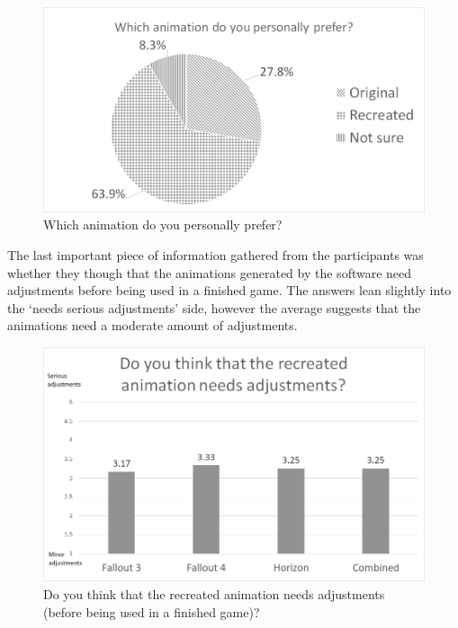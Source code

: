 \begin{figure}[!ht]
\centerline{\includegraphics[width = 42em]{img/results/prefer.png}}
\caption{Which animation do you personally prefer?}\label{fig:prefer_graph}
\end{figure}


The last important piece of information gathered from the participants was whether they though that the animations generated by the software need adjustments before being used in a finished game. The answers lean slightly into the `needs serious adjustments' side, however the average suggests that the animations need a moderate amount of adjustments.

\begin{figure}[!ht]
	\centerline{\includegraphics[width = 42em]{img/results/adjustments.png}}
	\caption{Do you think that the recreated animation needs adjustments (before being used in a finished game)?}\label{fig:adjustments_graph}
\end{figure}











